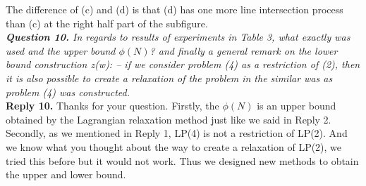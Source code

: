 \documentclass[11pt]{article}
\begin{document}
The difference of (c) and (d) is that (d) has one more line intersection process than (c) at the right half part of the subfigure.
~\\[4mm]
\noindent \textit{\textbf{Question 10.}
In regards to results of experiments in Table 3, what exactly was used and the upper bound $\phi(N)$? and finally a general remark on the lower bound construction z(w):
-- if we consider problem (4) as a restriction of (2), then it is also possible to create a relaxation of the problem in the similar was as problem (4) was constructed.}
\\[2mm]
\noindent \textbf{Reply 10.}
Thanks for your question. Firstly, the $\phi(N)$ is an upper bound obtained by the Lagrangian relaxation method just like we said in Reply 2.
Secondly, as we mentioned in Reply 1, LP(4) is not a restriction of LP(2). And we know what you thought about the way to create a relaxation of LP(2), we tried this before but it would not work. Thus we designed new methods to obtain the upper and lower bound.

~\\[4mm]


%
%
%
%
%
%
%
%
\end{document}
